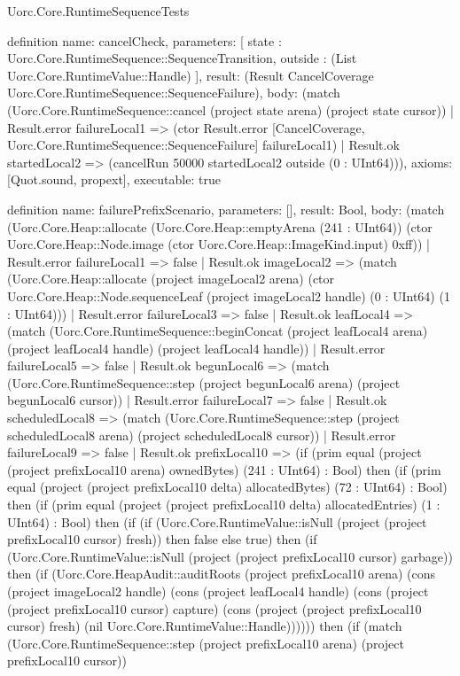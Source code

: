 \begin{lexlean}{Uorc.Core.RuntimeSequenceTests}
\begin{semanticmodule}
definition{
  name: cancelCheck,
  parameters: [
    state : Uorc.Core.RuntimeSequence::SequenceTransition,
    outside : (List Uorc.Core.RuntimeValue::Handle)
  ],
  result: (Result CancelCoverage Uorc.Core.RuntimeSequence::SequenceFailure),
  body: (match (Uorc.Core.RuntimeSequence::cancel (project state arena) (project state cursor))
    | Result.error failureLocal1 => (ctor Result.error [CancelCoverage, Uorc.Core.RuntimeSequence::SequenceFailure] failureLocal1)
    | Result.ok startedLocal2 => (cancelRun 50000 startedLocal2 outside (0 : UInt64))),
  axioms: [Quot.sound, propext],
  executable: true
}

definition{
  name: failurePrefixScenario,
  parameters: [],
  result: Bool,
  body: (match (Uorc.Core.Heap::allocate (Uorc.Core.Heap::emptyArena (241 : UInt64)) (ctor Uorc.Core.Heap::Node.image (ctor Uorc.Core.Heap::ImageKind.input) 0xff))
    | Result.error failureLocal1 => false
    | Result.ok imageLocal2 => (match (Uorc.Core.Heap::allocate (project imageLocal2 arena) (ctor Uorc.Core.Heap::Node.sequenceLeaf (project imageLocal2 handle) (0 : UInt64) (1 : UInt64)))
      | Result.error failureLocal3 => false
      | Result.ok leafLocal4 => (match (Uorc.Core.RuntimeSequence::beginConcat (project leafLocal4 arena) (project leafLocal4 handle) (project leafLocal4 handle))
        | Result.error failureLocal5 => false
        | Result.ok begunLocal6 => (match (Uorc.Core.RuntimeSequence::step (project begunLocal6 arena) (project begunLocal6 cursor))
          | Result.error failureLocal7 => false
          | Result.ok scheduledLocal8 => (match (Uorc.Core.RuntimeSequence::step (project scheduledLocal8 arena) (project scheduledLocal8 cursor))
            | Result.error failureLocal9 => false
            | Result.ok prefixLocal10 => (if (prim equal (project (project prefixLocal10 arena) ownedBytes) (241 : UInt64) : Bool) then (if (prim equal (project (project prefixLocal10 delta) allocatedBytes) (72 : UInt64) : Bool) then (if (prim equal (project (project prefixLocal10 delta) allocatedEntries) (1 : UInt64) : Bool) then (if (if (Uorc.Core.RuntimeValue::isNull (project (project prefixLocal10 cursor) fresh)) then false else true) then (if (Uorc.Core.RuntimeValue::isNull (project (project prefixLocal10 cursor) garbage)) then (if (Uorc.Core.HeapAudit::auditRoots (project prefixLocal10 arena) (cons (project imageLocal2 handle) (cons (project leafLocal4 handle) (cons (project (project prefixLocal10 cursor) capture) (cons (project (project prefixLocal10 cursor) fresh) (nil Uorc.Core.RuntimeValue::Handle)))))) then (if (match (Uorc.Core.RuntimeSequence::step (project prefixLocal10 arena) (project prefixLocal10 cursor))
}
\end{semanticmodule}
\end{lexlean}
